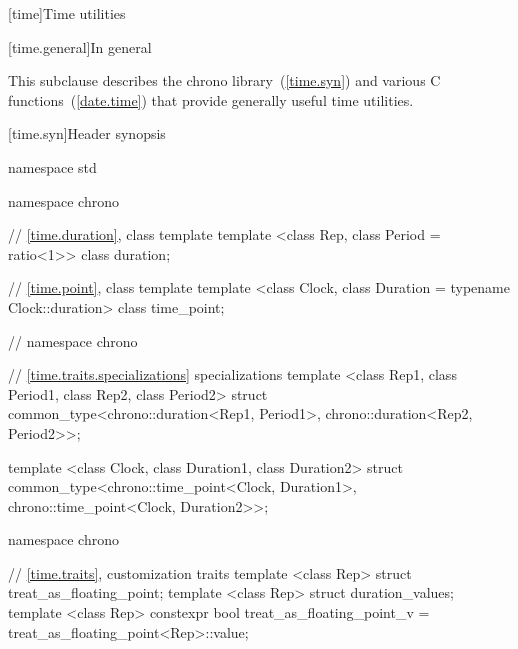 [time]{Time utilities}

[time.general]{In general}

\pnum
{}%
This subclause describes the chrono library~(\ref{time.syn}) and various C
functions~(\ref{date.time}) that provide generally useful time
utilities.

[time.syn]{Header  synopsis}

\begin{codeblock}
namespace std {
namespace chrono {

// \ref{time.duration}, class template 
template <class Rep, class Period = ratio<1>> class duration;

// \ref{time.point}, class template 
template <class Clock, class Duration = typename Clock::duration> class time_point;
}  // namespace chrono

// \ref{time.traits.specializations}  specializations
template <class Rep1, class Period1, class Rep2, class Period2>
  struct common_type<chrono::duration<Rep1, Period1>, chrono::duration<Rep2, Period2>>;

template <class Clock, class Duration1, class Duration2>
  struct common_type<chrono::time_point<Clock, Duration1>, chrono::time_point<Clock, Duration2>>;

namespace chrono {

// \ref{time.traits}, customization traits
template <class Rep> struct treat_as_floating_point;
template <class Rep> struct duration_values;
template <class Rep> constexpr bool treat_as_floating_point_v
  = treat_as_floating_point<Rep>::value;

}}
\end{codeblock}
